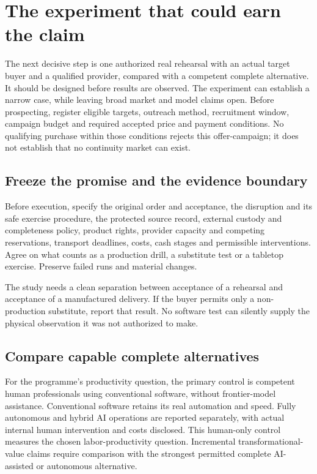 \documentclass[11pt,a4paper]{article}
\begin{document}
\section{The experiment that could earn the claim}\label{sec:experiment}
The next decisive step is one authorized real rehearsal with an actual target buyer and a qualified provider, compared with a competent complete alternative. It should be designed before results are observed. The experiment can establish a narrow case, while leaving broad market and model claims open. Before prospecting, register eligible targets, outreach method, recruitment window, campaign budget and required accepted price and payment conditions. No qualifying purchase within those conditions rejects this offer-campaign; it does not establish that no continuity market can exist.

\subsection{Freeze the promise and the evidence boundary}
Before execution, specify the original order and acceptance, the disruption and its safe exercise procedure, the protected source record, external custody and completeness policy, product rights, provider capacity and competing reservations, transport deadlines, costs, cash stages and permissible interventions. Agree on what counts as a production drill, a substitute test or a tabletop exercise. Preserve failed runs and material changes.

The study needs a clean separation between acceptance of a rehearsal and acceptance of a manufactured delivery. If the buyer permits only a non-production substitute, report that result. No software test can silently supply the physical observation it was not authorized to make.

\subsection{Compare capable complete alternatives}
For the programme's productivity question, the primary control is competent human professionals using conventional software, without frontier-model assistance. Conventional software retains its real automation and speed. Fully autonomous and hybrid AI operations are reported separately, with actual internal human intervention and costs disclosed. This human-only control measures the chosen labor-productivity question. Incremental transformational-value claims require comparison with the strongest permitted complete AI-assisted or autonomous alternative.
\end{document}
